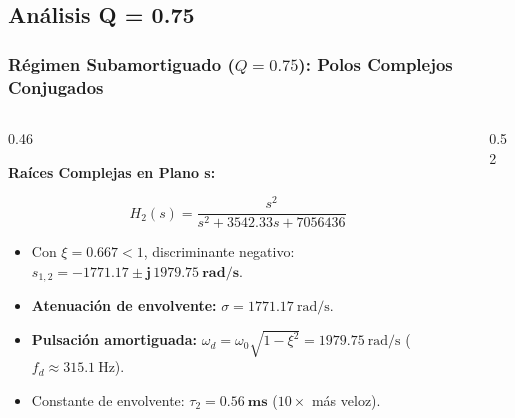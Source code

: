 \subsection{Análisis Q = 0.75}
\begin{frame}
  \frametitle{Régimen Subamortiguado ($Q = 0.75$): Polos Complejos Conjugados}

  \begin{columns}[c, onlytextwidth]
    \begin{column}{0.46\textwidth}
      \begin{tarjeta}
        {\fontsize{9pt}{11pt}\selectfont \textbf{\color{NavyDark} Raíces Complejas en Plano s:}}\\[2pt]
        {\fontsize{7.5pt}{9.2pt}\selectfont
        \[ H_2(s) = \frac{s^2}{s^2 + 3542.33 s + 7056436} \]
        \begin{itemize}\setlength{\itemsep}{2pt}
          \item Con $\xi = 0.667 < 1$, discriminante negativo:
          $s_{1,2} = \mathbf{-1771.17 \pm j\, 1979.75\ \unit{\radian\per\second}}$.
          \item \textbf{Atenuación de envolvente:} $\sigma = \qty{1771.17}{\radian\per\second}$.
          \item \textbf{Pulsación amortiguada:}
          $\omega_d = \omega_0 \sqrt{1 - \xi^2} = \qty{1979.75}{\radian\per\second}$ ($f_d \approx \qty{315.1}{\hertz}$).
          \item Constante de envolvente: $\tau_2 = \mathbf{\qty{0.56}{\milli\second}}$ ($10\times$ más veloz).
        \end{itemize}
        }
      \end{tarjeta}
    \end{column}

    \begin{column}{0.52\textwidth}
      \centering
    \end{column}
  \end{columns}
\end{frame}

